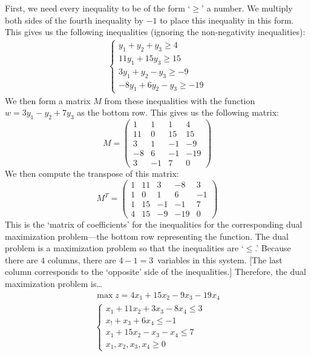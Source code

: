 \documentclass[12pt,letterpaper]{exam}
\begin{document}
\begin{questions}
\sol First, we need every inequality to be of the form `$\geq$' a number. We multiply both sides of the fourth inequality by $-1$ to place this inequality in this form. This gives us the following inequalities (ignoring the non-negativity inequalities):
	\[
	\begin{gathered}
	\begin{cases}
	y_1 + y_2 + y_3 \geq 4 \\
	11y_1 + 15y_3 \geq 15 \\
	3y_1 + y_2 - y_3 \geq -9 \\
	-8y_1 + 6y_2 - y_3 \geq -19 	
	\end{cases}
	\end{gathered}
	\]
We then form a matrix $M$ from these inequalities with the function $w= 3y_1 - y_2 + 7y_3$ as the bottom row. This gives us the following matrix: 
	\[
	M=
	\begin{pmatrix}
	1 & 1 & 1 & 4 \\
	11 & 0 & 15 & 15 \\
	3 & 1 & -1 & -9 \\
	-8 & 6 & -1 & -19 \\
	3 & -1 & 7 & 0 
	\end{pmatrix}
	\]
We then compute the transpose of this matrix:
	\[
	M^T= 
	\begin{pmatrix}
	1 & 11 & 3 & -8 & 3 \\
	1 & 0 & 1 & 6 & -1 \\
	1 & 15 & -1 & -1 & 7 \\
	4 & 15 & -9 & -19 & 0 
	\end{pmatrix}
	\]
This is the `matrix of coefficients' for the inequalities for the corresponding dual maximization problem---the bottom row representing the function. The dual problem is a maximization problem so that the inequalities are `$\leq$.' Because there are $4$ columns, there are $4 - 1= 3$~variables in this system. [The last column corresponds to the `opposite' side of the inequalities.] Therefore, the dual maximization problem is\dots
	\[
	\begin{gathered}
	\max z= 4x_1 +15x_2 - 9x_3 - 19x_4 \\
	\begin{cases}
	x_1 + 11x_2 + 3x_3 - 8x_4 \leq 3 \\
	x_! + x_3 + 6x_4 \leq -1 \\
	x_1 + 15x_2 - x_3 - x_4 \leq 7 \\
	x_1, x_2, x_3, x_4 \geq 0
	\end{cases}
	\end{gathered}
	\] 




\end{questions}
\end{document}
